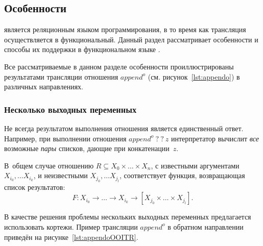 \subsection{Особенности \miniKanren{}}
\label{lab:features}

\miniKanren{} является реляционным языком программирования, в то время как трансляция осуществляется в функциональный.
Данный раздел рассматривает особенности \miniKanren{} и способы их поддержки в функциональном языке \haskell{}.

Все рассматриваемые в данном разделе особенности проиллюстрированы результатами трансляции отношения $append^o$ (см. рисунок~\ref{lst:appendo}) в различных направлениях.


\subsubsection{Несколько выходных переменных}

Не всегда результатом выполнения отношения является единственный ответ.
Например, при выполнении отношения $append^o \ ? \ ? \ z$ интерпретатор \miniKanren{} вычислит \emph{все} возможные \emph{пары} списков, дающие при конкатенации~$z$.

В~общем случае отношению $R \subseteq X_0 \times \dots \times X_n$, с известными аргументами $X_{i_0}, \dots X_{i_k}$, и неизвестными $X_{j_0}, \dots X_{j_l}$, соответствует функция, возвращающая список результатов: 
\[F : X_{i_0} \to \dots \to X_{i_k} \to [X_{j_0} \times \dots \times X_{j_l}].\]

В качестве решения проблемы нескольких выходных переменных предлагается использовать кортежи.
Пример трансляции $append^o$ в обратном направлении приведён на рисунке~\ref{lst:appendoOOITR}.

